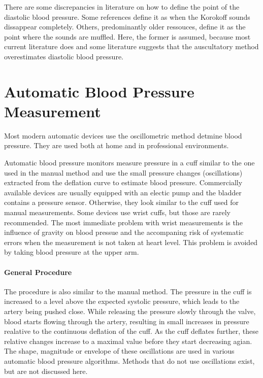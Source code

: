 There are some discrepancies in literature on how to define the point of the diastolic blood pressure. Some references define it as when the Korokoff sounds dissappear completely. \cite{NHS2019,Reeves1995} Others, predominantly older ressouces, define it as the point where the sounds are muffled.\cite{Boron2012} Here, the former is assumed, because most current literature does and some literature suggests that the auscultatory method overestimates diastolic blood pressure. \cite{Chandrasekhar2019} 


\section{Automatic Blood Pressure Measurement}

Most modern automatic devices use the oscillometric method detmine blood pressure. They are used both at home and in professional environments. 

Automatic blood pressure monitors measure pressure in a cuff similar to the one used in the manual method and use the small pressure changes (oscillations) extracted from the deflation curve to estimate blood pressure. Commercially available devices are usually equipped with an electic pump and the bladder contains a pressure sensor. Otherwise, they look similar to the cuff used for manual measurements. Some devices use wrist cuffs, but those are rarely recommended. \cite{BIHSOC2020} The most immediate problem with wrist measurements is the influence of gravity on blood pressue and the accompaning risk of systematic errors when the measurement is not taken at heart level. \cite{Boron2012} This problem is avoided by taking blood pressure at the upper arm. 

\paragraph{General Procedure} The procedure is also similar to the manual method. The pressure in the cuff is increased to a level above the expected systolic pressure, which leads to the artery being pushed close. While releasing the pressure slowly through the valve, blood starts flowing through the artery, resulting in small increases in pressure realative to the continuous deflation of the cuff. As the cuff deflates further, these relative changes increase to a maximal value before they start decreasing agian.\cite{Forouzanfar2015,Drzewiecki1994,Ursino1996} The shape, magnitude or envelope of these oscillations are used in various automatic blood pressure algorithms. Methods that do not use oscillations exist, but are not discussed here.


